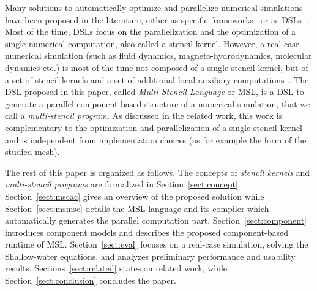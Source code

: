 Many solutions to automatically optimize and parallelize numerical simulations have been proposed in the literature, either as specific frameworks~\cite{CPE:CPE3494,Trilinos-Overview,petsc-efficient} or as DSLs~\cite{spaaTangCKLL11,citeulike12258902,Giles2011,DeVito2011LDS}. Most of the time, DSLs focus on the parallelization and the optimization of a single numerical computation, also called a stencil kernel.
However, a real case numerical simulation (such as fluid dynamics, magneto-hydrodynamics, molecular dynamics etc.) is most of the time not composed of a single stencil kernel, but of a set of stencil kernels and a set of additional local auxiliary computations~\cite{Ragan-Kelley:2013:HLC:2491956.2462176}. The DSL proposed in this paper, called \emph{Multi-Stencil Language} or MSL, is a DSL to generate a parallel component-based structure of a numerical simulation, that we call a \emph{multi-stencil program}. As discussed in the related work, this work is complementary to the optimization and parallelization of a single stencil kernel and is independent from implementation choices (as for example the form of the studied mesh).

The rest of this paper is organized as follows. The concepts of \emph{stencil kernels} and \emph{multi-stencil programs} are formalized in Section~\ref{sect:concept}. Section~\ref{sect:mscac} gives an overview of the proposed solution while Section~\ref{sect:msmsc} details the MSL language and its compiler which automatically generates the parallel computation part. Section~\ref{sect:component} introduces component models and describes the proposed component-based runtime of MSL.
Section~\ref{sect:eval} focuses on a real-case simulation, solving the Shallow-water equations, and analyzes preliminary performance and usability results. Sections~\ref{sect:related} states on related work, while Section~\ref{sect:conclusion} concludes the paper.
